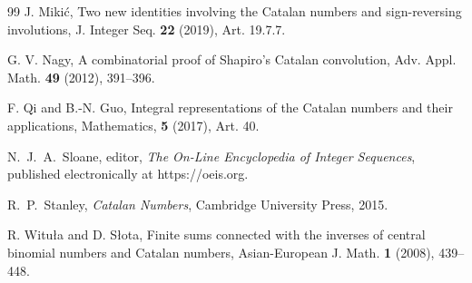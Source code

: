 \documentclass[12pt,reqno]{article}
\begin{document}
\begin{thebibliography}{99}
\vspace{-1pt}
J. Miki\'{c}, Two new identities involving the Catalan numbers and sign-reversing involutions, J. Integer Seq. \textbf{22} (2019), 
Art. 19.7.7.

\vspace{-1pt}
G. V. Nagy, A combinatorial proof of Shapiro's Catalan convolution, Adv. Appl. Math. \textbf{49} (2012), 391--396.

\vspace{-1pt}
F. Qi and B.-N. Guo, Integral representations of the Catalan numbers and their applications, Mathematics, \textbf{5} (2017), Art. 40.

\vspace{-1pt}
N.~J.~A.~Sloane, editor, \emph{The On-Line Encyclopedia of Integer Sequences}, published electronically at https://oeis.org.

\vspace{-1pt}
R.~P.~Stanley, \emph{Catalan Numbers}, Cambridge University Press, 2015.

\vspace{-1pt} 
R. Witu\l a and D. S\l ota, Finite sums connected with the inverses of central binomial numbers and Catalan numbers, 
Asian-European J. Math. \textbf{1} (2008), 439--448.


\end{thebibliography}
\end{document}
